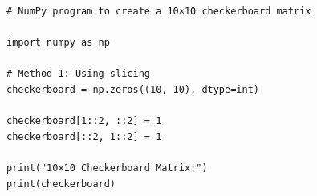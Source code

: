 \begin{verbatim}
# NumPy program to create a 10×10 checkerboard matrix

import numpy as np

# Method 1: Using slicing
checkerboard = np.zeros((10, 10), dtype=int)

checkerboard[1::2, ::2] = 1
checkerboard[::2, 1::2] = 1

print("10×10 Checkerboard Matrix:")
print(checkerboard)
\end{verbatim}